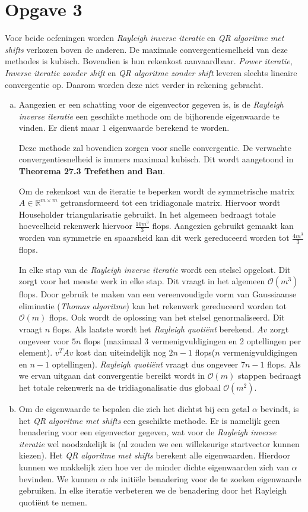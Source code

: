 \documentclass[a4paper]{article}
\newcommand{\opgave}[1]{\section*{Opgave #1}}
\begin{document}
\opgave{3}
Voor beide oefeningen worden \textit{Rayleigh inverse iteratie} en \textit{QR algoritme met shifts} verkozen boven de anderen. De maximale convergentiesnelheid van deze methodes is kubisch. Bovendien is hun rekenkost aanvaardbaar. \textit{Power iteratie}, \textit{Inverse iteratie zonder shift} en \textit{QR algoritme zonder shift} leveren slechts lineaire convergentie op. Daarom worden deze niet verder in rekening gebracht. 
\begin{enumerate}[a)] %
\item 
Aangezien er een schatting voor de eigenvector gegeven is, is de \textit{Rayleigh inverse iteratie} een geschikte methode om de bijhorende eigenwaarde te vinden. Er dient maar 1 eigenwaarde berekend te worden. 

Deze methode zal bovendien zorgen voor snelle convergentie. De verwachte convergentiesnelheid is immers maximaal kubisch. Dit wordt aangetoond in \textbf{Theorema 27.3 Trefethen and Bau}. 

Om de rekenkost van de iteratie te beperken wordt de symmetrische matrix $A \in \mathbb{R}^{m\times m}$ getransformeerd tot een tridiagonale matrix. Hiervoor wordt Householder triangularisatie gebruikt. In het algemeen bedraagt totale hoeveelheid rekenwerk hiervoor  $\frac{10m^{3}}{3}$ flops. Aangezien gebruikt gemaakt kan worden van symmetrie en spaarsheid kan dit werk gereduceerd worden tot $\frac{4m^{3}}{3}$ flops. 

In elke stap van de \textit{Rayleigh inverse iteratie} wordt een stelsel opgelost. Dit zorgt voor het meeste werk in elke stap. Dit vraagt in het algemeen $\mathcal{O} (m^3)$ flops. Door gebruik te maken van een vereenvoudigde vorm van Gaussiaanse eliminatie (\textit{Thomas algoritme}) kan het rekenwerk gereduceerd worden tot $\mathcal{O}(m)$ flops. Ook wordt de oplossing van het stelsel genormaliseerd. Dit vraagt $n$ flops. Als laatste wordt het \textit{Rayleigh quoti\"ent} berekend. $Av$ zorgt ongeveer voor $5n$ flops (maximaal 3 vermenigvuldigingen en 2 optellingen per element). $v^{T}Av$ kost dan uiteindelijk nog $2n-1$ flops($n$ vermenigvuldigingen en $n-1$ optellingen). \textit{Rayleigh quoti\"ent} vraagt dus ongeveer $7n-1$ flops. Als we ervan uitgaan dat convergentie bereikt wordt in $\mathcal{O}(m)$ stappen bedraagt het totale rekenwerk na de tridiagonalisatie dus globaal $\mathcal{O} (m^2)$.

\item
Om de eigenwaarde te bepalen die zich het dichtst bij een getal $\alpha$ bevindt, is het \textit{QR algoritme met shifts} een geschikte methode. Er is namelijk geen benadering voor een eigenvector gegeven, wat voor de \textit{Rayleigh inverse iteratie} wel noodzakelijk is (al zouden we een willekeurige startvector kunnen kiezen). Het \textit{QR algoritme met shifts} berekent alle eigenwaarden. Hierdoor kunnen we makkelijk zien hoe ver de minder dichte eigenwaarden zich van $\alpha$ bevinden. We kunnen $\alpha$ als initi\"ele benadering voor de te zoeken eigenwaarde gebruiken. In elke iteratie verbeteren we de benadering door het Rayleigh quoti\"ent te nemen. 


\end{enumerate}
\end{document}
